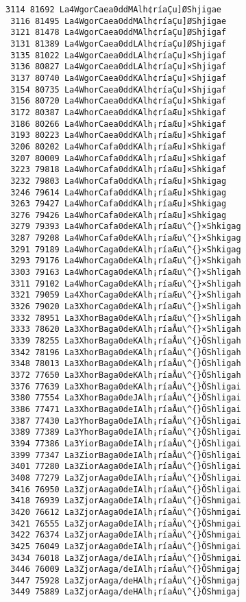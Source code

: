 \documentclass[11pt]{article}
\begin{document}
\begin{Verbatim}[commandchars=\\\{\}]
 3114 81692 La4WgorCaea0ddMAlh¢ríaÇu]ØShjigae
 3116 81495 La4WgorCaea0ddMAlh¢ríaÇu]ØShjigae
 3121 81478 La4WgorCaea0ddMAlh¢ríaÇu]ØShjigaf
 3131 81389 La4WgorCaea0ddLAlh¢ríaÇu]ØShjigaf
 3135 81022 La4WgorCaea0ddLAlh¢ríaÇu]×Shjigaf
 3136 80827 La4WgorCaea0ddLAlh¢ríaÇu]×Shjigaf
 3137 80740 La4WgorCaea0ddKAlh¢ríaÇu]×Shjigaf
 3154 80735 La4WhorCaea0ddKAlh¢ríaÇu]×Shjigaf
 3156 80720 La4WhorCaea0ddKAlh¢ríaÇu]×Shkigaf
 3172 80387 La4WhorCaea0ddKAlh¢ríaÆu]×Shkigaf
 3186 80266 La4WhorCaea0ddKAlh¡ríaÆu]×Shkigaf
 3193 80223 La4WhorCaea0ddKAlh¡ríaÆu]×Shkigaf
 3206 80202 La4WhorCafa0ddKAlh¡ríaÆu]×Shkigaf
 3207 80009 La4WhorCafa0ddKAlh¡ríaÆu]×Shkigaf
 3223 79818 La4WhorCafa0ddKAlh¡ríaÆu]×Shkigaf
 3232 79803 La4WhorCafa0ddKAlh¡ríaÆu]×Shkigag
 3246 79614 La4WhorCafa0ddKAlh¡ríaÆu]×Shkigag
 3263 79427 La4WhorCafa0ddKAlh¡ríaÆu]×Shkigag
 3276 79426 La4WhorCafa0deKAlh¡ríaÆu]×Shkigag
 3279 79393 La4WhorCafa0deKAlh¡ríaÆu\^{}×Shkigag
 3287 79208 La4WhorCafa0deKAlh¡ríaÆu\^{}×Shkigag
 3291 79189 La4WhorCaga0deKAlh¡ríaÆu\^{}×Shkigag
 3293 79176 La4WhorCaga0deKAlh¡ríaÆu\^{}×Shkigah
 3303 79163 La4WhorCaga0deKAlh¡ríaÆu\^{}×Shligah
 3311 79102 La4WhorCaga0deKAlh¡ríaÆu\^{}×Shligah
 3321 79059 La4XhorCaga0deKAlh¡ríaÆu\^{}×Shligah
 3326 79020 La3XhorCaga0deKAlh¡ríaÆu\^{}×Shligah
 3332 78951 La3XhorBaga0deKAlh¡ríaÆu\^{}×Shligah
 3333 78620 La3XhorBaga0deKAlh¡ríaÅu\^{}×Shligah
 3339 78255 La3XhorBaga0deKAlh¡ríaÅu\^{}ÖShligah
 3342 78196 La3XhorBaga0deKAlh¡ríaÅu\^{}ÖShligah
 3348 78013 La3XhorBaga0deKAlh¡ríaÅu\^{}ÖShligah
 3372 77650 La3XhorBaga0deKAlh¡ríaÅu\^{}ÕShligah
 3376 77639 La3XhorBaga0deKAlh¡ríaÅu\^{}ÕShligai
 3380 77554 La3XhorBaga0deJAlh¡ríaÅu\^{}ÕShligai
 3386 77471 La3XhorBaga0deIAlh¡ríaÅu\^{}ÕShligai
 3387 77430 La3YhorBaga0deIAlh¡ríaÅu\^{}ÕShligai
 3389 77389 La3YhorBaga0deIAlh¡ríaÅu\^{}ÕShligai
 3394 77386 La3YiorBaga0deIAlh¡ríaÅu\^{}ÕShligai
 3399 77347 La3ZiorBaga0deIAlh¡ríaÅu\^{}ÕShligai
 3401 77280 La3ZiorAaga0deIAlh¡ríaÅu\^{}ÕShligai
 3408 77279 La3ZjorAaga0deIAlh¡ríaÅu\^{}ÕShligai
 3416 76950 La3ZjorAaga0deIAlh¡ríaÄu\^{}ÕShligai
 3418 76939 La3ZjorAaga0deIAlh¡ríaÄu\^{}ÕShmigai
 3420 76612 La3ZjorAaga0deIAlh¡ríaÃu\^{}ÕShmigai
 3421 76555 La3ZjorAaga0deIAlh¡ríaÃu\^{}ÕShmigai
 3422 76374 La3ZjorAaga0deIAlh¡ríaÃu\^{}ÕShmigai
 3425 76049 La3ZjorAaga0deIAlh¡ríaÂu\^{}ÕShmigai
 3434 76018 La3ZjorAaga/deIAlh¡ríaÂu\^{}ÕShmigai
 3446 76009 La3ZjorAaga/deIAlh¡ríaÂu\^{}ÕShmigaj
 3447 75928 La3ZjorAaga/deHAlh¡ríaÂu\^{}ÕShmigaj
 3449 75889 La3ZjorAaga/deHAlh¡ríaÂu\^{}ÕShmigaj

\end{Verbatim}
\end{document}
